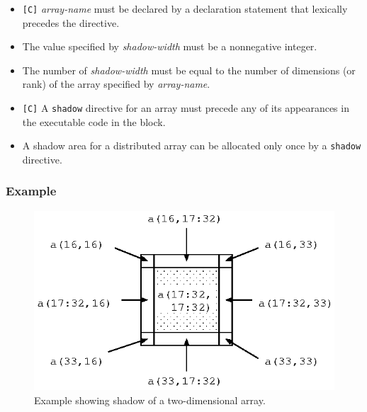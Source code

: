 \begin{itemize}
 \item \verb![C]! {\it array-name} must be declared by a declaration
       statement that lexically precedes the directive.
\item The value specified by {\it shadow-width} must be a nonnegative
      integer.
\item The number of {\it shadow-width} must be equal to the number of
      dimensions (or rank) of the array specified by {\it array-name}.
\item \verb![C]! A {\tt shadow} directive for an array must
      precede any of its appearances in the executable code in the block.
\item A shadow area for a distributed array can be allocated only once by a {\tt shadow} directive.
\end{itemize}

\subsubsection*{Example}

\begin{minipage}{0.5\hsize}
\begin{center}

\end{center}
\end{minipage}
%
\hspace{0.5cm}
%
\begin{minipage}{0.4\hsize} 
\begin{figure}[H]
\begin{center}
\includegraphics[width=\hsize]{figs/fig3.1.eps}
\end{center}
\caption{Example showing shadow of a two-dimensional array.}
\label{fig3.1}
\end{figure}
\end{minipage}

